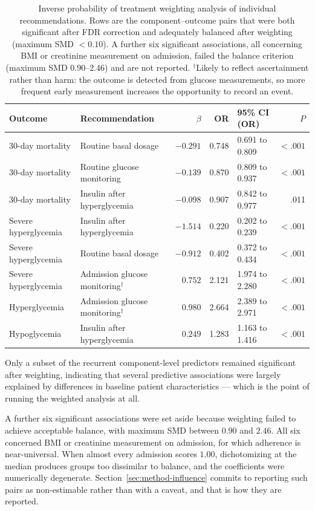 \begin{table}[htbp]
\centering
\singlespacing
\caption{Inverse probability of treatment weighting analysis of individual recommendations. Rows are the component--outcome pairs that were both significant after FDR correction and adequately balanced after weighting (maximum SMD $<0.10$). A further six significant associations, all concerning BMI or creatinine measurement on admission, failed the balance criterion (maximum SMD $0.90$--$2.46$) and are not reported. $^{\dagger}$Likely to reflect ascertainment rather than harm: the outcome is detected from glucose measurements, so more frequent early measurement increases the opportunity to record an event.}
\label{tab:iptw-patterns}
\small
\setlength{\tabcolsep}{4pt}
\begin{tabular}{llrrlr}
\toprule
Outcome & Recommendation & $\beta$ & OR & 95\% CI (OR) & $P$ \\
\midrule
30-day mortality & Routine basal dosage
  & $-0.291$ & 0.748 & 0.691 to 0.809 & $<.001$ \\
30-day mortality & Routine glucose monitoring
  & $-0.139$ & 0.870 & 0.809 to 0.937 & $<.001$ \\
30-day mortality & Insulin after hyperglycemia
  & $-0.098$ & 0.907 & 0.842 to 0.977 & .011 \\
\midrule
Severe hyperglycemia & Insulin after hyperglycemia
  & $-1.514$ & 0.220 & 0.202 to 0.239 & $<.001$ \\
Severe hyperglycemia & Routine basal dosage
  & $-0.912$ & 0.402 & 0.372 to 0.434 & $<.001$ \\
Severe hyperglycemia & Admission glucose monitoring$^{\dagger}$
  & $0.752$ & 2.121 & 1.974 to 2.280 & $<.001$ \\
\midrule
Hyperglycemia & Admission glucose monitoring$^{\dagger}$
  & $0.980$ & 2.664 & 2.389 to 2.971 & $<.001$ \\
\midrule
Hypoglycemia & Insulin after hyperglycemia
  & $0.249$ & 1.283 & 1.163 to 1.416 & $<.001$ \\
\bottomrule
\end{tabular}
\end{table}

Only a subset of the recurrent component-level predictors remained significant after weighting, indicating that several predictive associations were largely explained by differences in baseline patient characteristics --- which is the point of running the weighted analysis at all.

A further six significant associations were set aside because weighting failed to achieve acceptable balance, with maximum SMD between $0.90$ and $2.46$. All six concerned BMI or creatinine measurement on admission, for which adherence is near-universal. When almost every admission scores $1.00$, dichotomizing at the median produces groups too dissimilar to balance, and the coefficients were numerically degenerate. Section~\ref{sec:method-influence} commits to reporting such pairs as non-estimable rather than with a caveat, and that is how they are reported.

